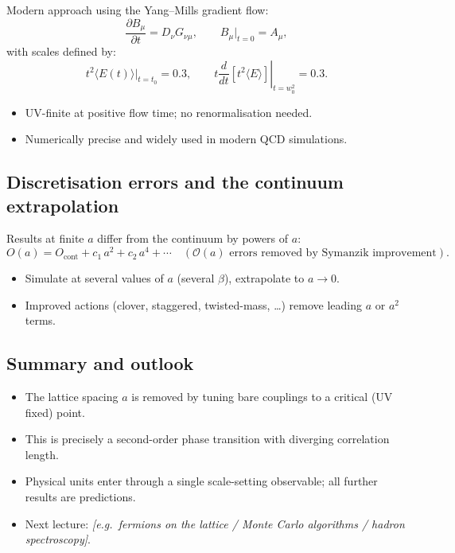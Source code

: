 \documentclass[11pt]{article}
\theoremstyle{definition}
\begin{document}
Modern approach using the Yang--Mills gradient flow:
\begin{equation}
    \frac{\partial B_\mu}{\partial t} = D_\nu G_{\nu\mu},\qquad B_\mu\big|_{t=0} = A_\mu,
\end{equation}
with scales defined by:
\begin{equation}
    t^2 \langle E(t)\rangle \big|_{t=t_0} = 0.3, \qquad
    \left. t\frac{d}{dt}\left[t^2\langle E\rangle\right]\right|_{t=w_0^2} = 0.3.
\end{equation}
\begin{itemize}
    \item UV-finite at positive flow time; no renormalisation needed.
    \item Numerically precise and widely used in modern QCD simulations.
\end{itemize}

\subsection{Discretisation errors and the continuum extrapolation}

Results at finite $a$ differ from the continuum by powers of $a$:
\begin{equation}
    O(a) = O_{\text{cont}} + c_1\,a^2 + c_2\,a^4 + \cdots \quad (\text{$\mathcal{O}(a)$ errors removed by Symanzik improvement}).
\end{equation}

\begin{itemize}
    \item Simulate at several values of $a$ (several $\beta$), extrapolate to $a\to 0$.
    \item Improved actions (clover, staggered, twisted-mass, \ldots) remove leading $a$ or $a^2$ terms.
\end{itemize}

\subsection{Summary and outlook}

\begin{itemize}
    \item The lattice spacing $a$ is removed by tuning bare couplings to a critical (UV fixed) point.
    \item This is precisely a second-order phase transition with diverging correlation length.
    \item Physical units enter through a single scale-setting observable; all further results are predictions.
    \item Next lecture: \emph{[e.g.\ fermions on the lattice / Monte Carlo algorithms / hadron spectroscopy]}.
\end{itemize}
\end{document}
